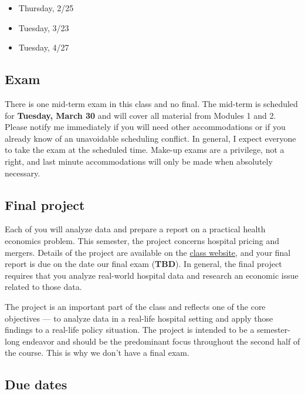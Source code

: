 \documentclass[11pt,]{article}
\providecommand{\tightlist}{%
  \setlength{\itemsep}{0pt}\setlength{\parskip}{0pt}}
\begin{document}
\begin{itemize}
\tightlist
\item
  Thursday, 2/25
\item
  Tuesday, 3/23
\item
  Tuesday, 4/27
\end{itemize}

\hypertarget{exam}{%
\subsection{Exam}\label{exam}}

There is one mid-term exam in this class and no final. The mid-term is
scheduled for \textbf{Tuesday, March 30} and will cover all material
from Modules 1 and 2. Please notify me immediately if you will need
other accommodations or if you already know of an unavoidable scheduling
conflict. In general, I expect everyone to take the exam at the
scheduled time. Make-up exams are a privilege, not a right, and last
minute accommodations will only be made when absolutely necessary.

\hypertarget{final-project}{%
\subsection{Final project}\label{final-project}}

Each of you will analyze data and prepare a report on a practical health
economics problem. This semester, the project concerns hospital pricing
and mergers. Details of the project are available on the
\href{https://mccarthy-spring21-econ372.netlify.app/}{class website},
and your final report is due on the date our final exam (\textbf{TBD}).
In general, the final project requires that you analyze real-world
hospital data and research an economic issue related to those data.

The project is an important part of the class and reflects one of the
core objectives --- to analyze data in a real-life hospital setting and
apply those findings to a real-life policy situation. The project is
intended to be a semester-long endeavor and should be the predominant
focus throughout the second half of the course. This is why we don't
have a final exam.

\hypertarget{due-dates}{%
\subsection{Due dates}\label{due-dates}}
\end{document}
